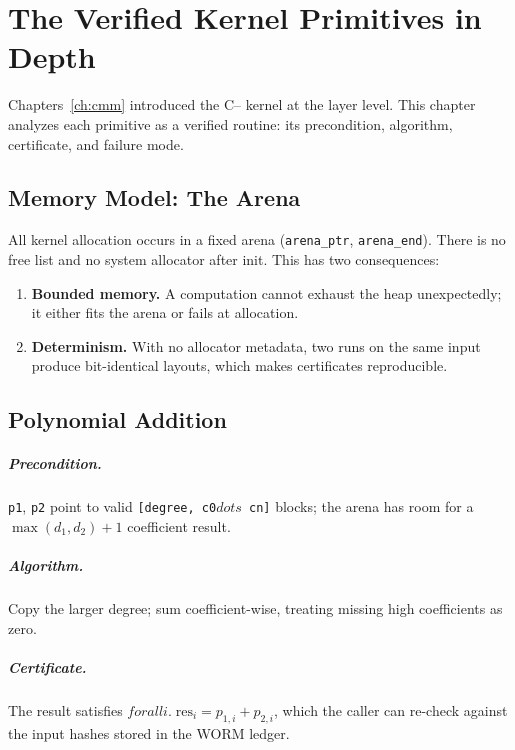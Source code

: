 \chapter{The Verified Kernel Primitives in Depth}
\label{ch:kernel}

Chapters~\ref{ch:cmm} introduced the C{--} kernel at the layer level. This
chapter analyzes each primitive as a verified routine: its precondition,
algorithm, certificate, and failure mode.

\section{Memory Model: The Arena}
\label{sec:kern-arena}

All kernel allocation occurs in a fixed arena (\texttt{arena\_ptr},
\texttt{arena\_end}). There is no free list and no system allocator after
init. This has two consequences:
\begin{enumerate}
  \item \textbf{Bounded memory.} A computation cannot exhaust the heap
        unexpectedly; it either fits the arena or fails at allocation.
  \item \textbf{Determinism.} With no allocator metadata, two runs on the
        same input produce bit-identical layouts, which makes certificates
        reproducible.
\end{enumerate}

\section{Polynomial Addition}
\label{sec:kern-poly}

\paragraph{Precondition.} \texttt{p1}, \texttt{p2} point to valid
\texttt{[degree, c0\ensuremath{dots} cn]} blocks; the arena has room for a
$\max(d_1,d_2)+1$ coefficient result.
\paragraph{Algorithm.} Copy the larger degree; sum coefficient-wise, treating
missing high coefficients as zero.
\paragraph{Certificate.} The result satisfies
$\ensuremath{forall} i.\; \text{res}_i = p_{1,i} + p_{2,i}$, which the caller can re-check
against the input hashes stored in the WORM ledger.
